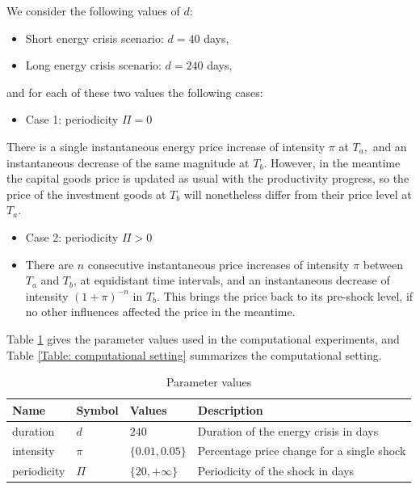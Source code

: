 We consider the following values of $d$:

\begin{itemize}
\item Short energy crisis scenario: $d=40$ days,

\item Long energy crisis scenario: $d=240$ days,
\end{itemize}

and for each of these two values the following cases:

\begin{itemize}
\item Case 1: periodicity $\Pi=0$
\end{itemize}

There is a single instantaneous energy price increase of intensity $\pi $ at 
$T_{a},$ and an instantaneous decrease of the same magnitude at $T_{b}.$
However, in the meantime the capital goods price is updated as usual with
the productivity progress, so the price of the investment goods at $T_{b}$
will nonetheless differ from their price level at $T_{a}$.

\begin{itemize}
\item Case 2: periodicity $\Pi>0$

\item There are $n$ consecutive instantaneous price increases of intensity $%
\pi $ between $T_{a}$ and $T_{b}$, at equidistant time intervals, and an
instantaneous decrease of intensity $(1+\pi )^{-n}$ in $T_{b}$. This brings
the price back to its pre-shock level, if no other influences affected the
price in the meantime.
\end{itemize}

Table \ref{Table: parameter settings} gives the parameter values used in the
computational experiments, and Table \ref{Table: computational setting}
summarizes the computational setting.

\begin{table}[tbp]
\caption{Parameter values}
\label{Table: parameter settings}\centering
\begin{tabular}{llll}
\hline\hline
Name & Symbol & Values & Description \\ \hline
duration & $d$ & $240$ & Duration of the energy crisis in days \\ 
intensity & $\pi$ & $\{0.01, 0.05\}$ & Percentage price change for a single
shock \\ 
periodicity & $\Pi$ & $\{20, +\infty\}$ & Periodicity of the shock in days%
\end{tabular}%
\end{table}

